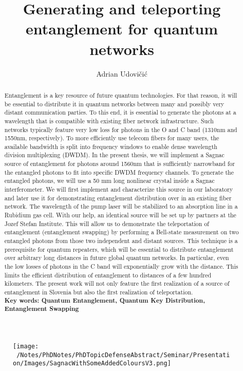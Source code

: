 \documentclass{article}
\title{Generating and teleporting entanglement for quantum networks}
\author{Adrian Udovičić}
\date{}
\begin{document}
\maketitle

\begin{abstract}
Entanglement is a key resource of future quantum technologies. For that reason, it will be essential to distribute 
it in quantum networks between many and possibly very distant communication parties. To this end, it is essential 
to generate the photons at a wavelength that is compatible with existing fiber network infrastructure. Such networks typically feature 
very low loss for photons in the O and C band (1310nm and 1550nm, respectively). To more 
efficiently use telecom fibers for many users, the available bandwidth is split into frequency windows to enable dense wavelength 
division multiplexing (DWDM). In the present thesis, we will implement a Sagnac source of entanglement for photons around 1560nm 
that is sufficiently narrowband for the entangled photons to fit into specific DWDM frequency channels. To generate the 
entangled photons, we will use a 50 mm long nonlinear crystal inside a Sagnac interferometer. We will first 
implement and characterize this source in our laboratory and later use it for demonstrating entanglement distribution over in an existing 
fiber network. The wavelength of the pump laser will be stabilized to an absorption line in a Rubidium gas cell. 
With our help, an identical source will be set up by partners at the Jozef Stefan Institute. This will allow us to demonstrate the teleportation of entanglement 
(entanglement swapping) by performing a Bell-state measurement on two entangled photons from those two independent and distant sources. This technique is a prerequisite for quantum 
repeaters, which will be essential to distribute entanglement over arbitrary long distances in future global quantum networks. In particular, even the low losses of photons in 
the C band will exponentially grow with the distance. This limits the efficient distribution of entanglement to distances of a few hundred kilometers.
The present work will not only feature the first realization of a source of entanglement in Slovenia but also the first realization of teleportation.\\
\textbf{Key words: Quantum Entanglement, Quantum Key Distribution, Entanglement Swapping}
\end{abstract}

\newpage
\tableofcontents
\newpage

\begin{figure}[h]
	\begin{center}
		\texttt{[image: ~/Notes/PhDNotes/PhDTopicDefenseAbstract/Seminar/Presentation/Images/SagnacWithSomeAddedColoursV3.png]}
	\end{center}
	\caption{}\label{fig:}
\end{figure}
\end{document}
